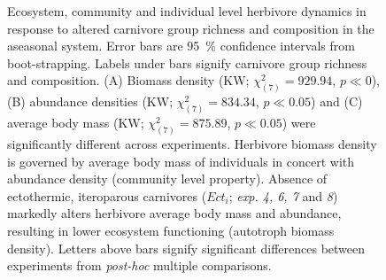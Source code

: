 \begin{figure}[htb!]
\centering

\caption[Ecosystem, community and individual level response to altered carnivore group richness and composition in the aseasonal system]{Ecosystem, community and individual level herbivore dynamics in response to altered carnivore group richness and composition in the aseasonal system. Error bars are 95~\% confidence intervals from boot-strapping. Labels under bars signify carnivore group richness and composition. (A) Biomass density (KW; $\chi^{2}_{(7)} = 929.94$, $p \ll 0$), (B) abundance densities (KW; $\chi^{2}_{(7)} = 834.34$, $p \ll 0.05$) and (C) average body mass (KW; $\chi^{2}_{(7)} = 875.89$, $p \ll 0.05$) were significantly different across experiments. Herbivore biomass density is governed by average body mass of individuals in concert with abundance density (community level property). Absence of ectothermic, iteroparous carnivores ($Ect_i$; \textit{exp. 4, 6, 7} and \textit{8}) markedly alters herbivore average body mass and abundance, resulting in lower ecosystem functioning (autotroph biomass density). Letters above bars signify significant differences between experiments from \textit{post-hoc} multiple comparisons. }
\label{fig:chap:res:dyn:cell0}
\end{figure}


\clearpage

%


